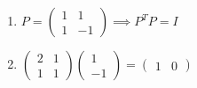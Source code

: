\documentclass[11pt,a4paper]{article}
\begin{document}
\begin{enumerate}
\item $\displaystyle P = \begin{pmatrix} 1 & 1 \\ 1 & -1 \end{pmatrix} \implies P^{T} P = I$
\item $\displaystyle \begin{pmatrix} 2 & 1 \\ 1 & 1 \end{pmatrix} \begin{pmatrix} 1 \\ -1 \end{pmatrix} = \begin{pmatrix} 1 & 0 \end{pmatrix}$
\end{enumerate}
\end{document}
